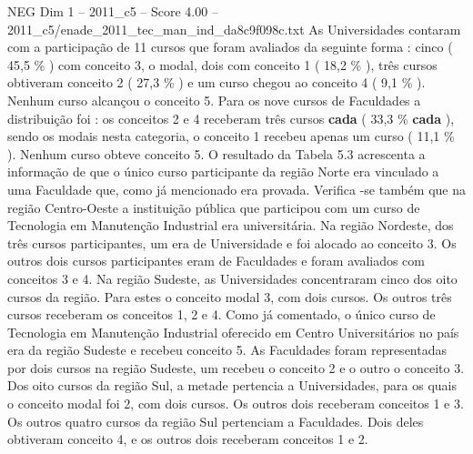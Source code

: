 \begin{textsample}{NEG Dim 1 – 2011\_c5 – Score 4.00 – 2011\_c5/enade\_2011\_tec\_man\_ind\_da8c9f098c.txt}
As Universidades contaram com a participação de 11 cursos que foram avaliados da seguinte forma : cinco ( 45,5 \% ) com conceito 3, o modal, dois com conceito 1 ( 18,2 \% ), três cursos obtiveram conceito 2 ( 27,3 \% ) e um curso chegou ao conceito 4 ( 9,1 \% ).
Nenhum curso alcançou o conceito 5.
Para os nove cursos de Faculdades a distribuição foi : os conceitos 2 e 4 receberam três cursos \textbf{cada} ( 33,3 \% \textbf{cada} ), sendo os modais nesta categoria, o conceito 1 recebeu apenas um curso ( 11,1 \% ).
Nenhum curso obteve conceito 5.
O resultado da Tabela 5.3 acrescenta a informação de que o único curso participante da região Norte era vinculado a uma Faculdade que, como já mencionado era provada.
Verifica -se também que na região Centro-Oeste a instituição pública que participou com um curso de Tecnologia em Manutenção Industrial era universitária.
Na região Nordeste, dos três cursos participantes, um era de Universidade e foi alocado ao conceito 3.
Os outros dois cursos participantes eram de Faculdades e foram avaliados com conceitos 3 e 4.
Na região Sudeste, as Universidades concentraram cinco dos oito cursos da região.
Para estes o conceito modal 3, com dois cursos.
Os outros três cursos receberam os conceitos 1, 2 e 4.
Como já comentado, o único curso de Tecnologia em Manutenção Industrial oferecido em Centro Universitários no país era da região Sudeste e recebeu conceito 5.
As Faculdades foram representadas por dois cursos na região Sudeste, um recebeu o conceito 2 e o outro o conceito 3.
Dos oito cursos da região Sul, a metade pertencia a Universidades, para os quais o conceito modal foi 2, com dois cursos.
Os outros dois receberam conceitos 1 e 3.
Os outros quatro cursos da região Sul pertenciam a Faculdades.
Dois deles obtiveram conceito 4, e os outros dois receberam conceitos 1 e 2.

\end{textsample}
